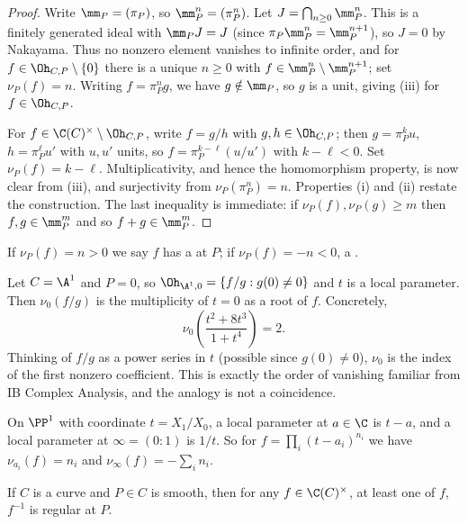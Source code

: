 \begin{proof}
	Write $\mm_P = (\pi_P)$, so $\mm_P^n = (\pi_P^n)$. Let $J = \bigcap_{n\geq 0}\mm_P^n$. This is a finitely generated ideal with $\mm_P J = J$ (since $\pi_P \mm_P^n = \mm_P^{n+1}$), so $J = 0$ by Nakayama. Thus no nonzero element vanishes to infinite order, and for $f \in \Oh_{C,P}\setminus\{0\}$ there is a unique $n \geq 0$ with $f \in \mm_P^n\setminus\mm_P^{n+1}$; set $\nu_P(f) = n$. Writing $f = \pi_P^n g$, we have $g \notin \mm_P$, so $g$ is a unit, giving (iii) for $f \in \Oh_{C,P}$.

	For $f \in \C(C)^\times\setminus\Oh_{C,P}$, write $f = g/h$ with $g,h \in \Oh_{C,P}$; then $g = \pi_P^ku$, $h = \pi_P^\ell u'$ with $u,u'$ units, so $f = \pi_P^{k-\ell}(u/u')$ with $k - \ell < 0$. Set $\nu_P(f) = k - \ell$. Multiplicativity, and hence the homomorphism property, is now clear from (iii), and surjectivity from $\nu_P(\pi_P^n) = n$. Properties (i) and (ii) restate the construction. The last inequality is immediate: if $\nu_P(f),\nu_P(g)\geq m$ then $f,g \in \mm_P^m$ and so $f+g \in \mm_P^m$.
\end{proof}

\begin{definition}
	If $\nu_P(f) = n > 0$ we say $f$ has a  at $P$; if $\nu_P(f) = -n < 0$, a .
\end{definition}

\begin{example}
	Let $C = \A^1$ and $P = 0$, so $\Oh_{\A^1,0} = \{f/g : g(0)\neq 0\}$ and $t$ is a local parameter. Then $\nu_0(f/g)$ is the multiplicity of $t = 0$ as a root of $f$. Concretely,
	$$\nu_0\!\left(\frac{t^2+8t^3}{1+t^4}\right) = 2.$$
	Thinking of $f/g$ as a power series in $t$ (possible since $g(0)\neq 0$), $\nu_0$ is the index of the first nonzero coefficient. This is exactly the order of vanishing familiar from IB Complex Analysis, and the analogy is not a coincidence.
\end{example}

\begin{example}
	On $\PP^1$ with coordinate $t = X_1/X_0$, a local parameter at $a \in \C$ is $t - a$, and a local parameter at $\infty = (0:1)$ is $1/t$. So for $f = \prod_i (t-a_i)^{n_i}$ we have $\nu_{a_i}(f) = n_i$ and $\nu_\infty(f) = -\sum_i n_i$.
\end{example}

\begin{corollary}\label{cor:foneover}
	If $C$ is a curve and $P \in C$ is smooth, then for any $f \in \C(C)^\times$, at least one of $f$, $f^{-1}$ is regular at $P$.
\end{corollary}

